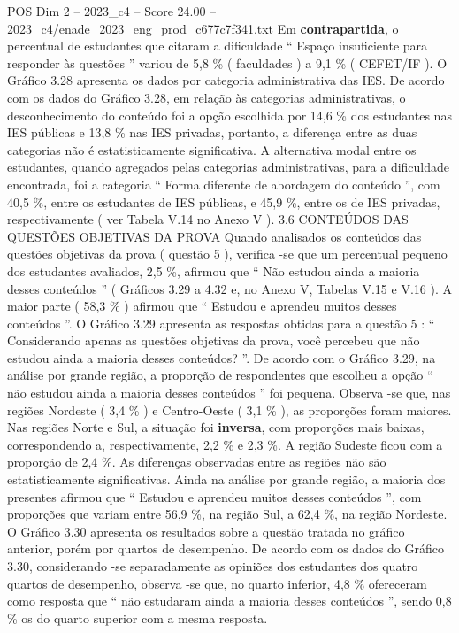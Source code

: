 \begin{textsample}{POS Dim 2 – 2023\_c4 – Score 24.00 – 2023\_c4/enade\_2023\_eng\_prod\_c677c7f341.txt}
Em \textbf{contrapartida}, o percentual de estudantes que citaram a dificuldade “ Espaço insuficiente para responder às questões ” variou de 5,8 \% ( faculdades ) a 9,1 \% ( CEFET/IF ).
O Gráfico 3.28 apresenta os dados por categoria administrativa das IES.
De acordo com os dados do Gráfico 3.28, em relação às categorias administrativas, o desconhecimento do conteúdo foi a opção escolhida por 14,6 \% dos estudantes nas IES públicas e 13,8 \% nas IES privadas, portanto, a diferença entre as duas categorias não é estatisticamente significativa.
A alternativa modal entre os estudantes, quando agregados pelas categorias administrativas, para a dificuldade encontrada, foi a categoria “ Forma diferente de abordagem do conteúdo ”, com 40,5 \%, entre os estudantes de IES públicas, e 45,9 \%, entre os de IES privadas, respectivamente ( ver Tabela V.14 no Anexo V ). 3.6 CONTEÚDOS DAS QUESTÕES OBJETIVAS DA PROVA Quando analisados os conteúdos das questões objetivas da prova ( questão 5 ), verifica -se que um percentual pequeno dos estudantes avaliados, 2,5 \%, afirmou que “ Não estudou ainda a maioria desses conteúdos ” ( Gráficos 3.29 a 4.32 e, no Anexo V, Tabelas V.15 e V.16 ).
A maior parte ( 58,3 \% ) afirmou que “ Estudou e aprendeu muitos desses conteúdos ”.
O Gráfico 3.29 apresenta as respostas obtidas para a questão 5 : “ Considerando apenas as questões objetivas da prova, você percebeu que não estudou ainda a maioria desses conteúdos? ”.
De acordo com o Gráfico 3.29, na análise por grande região, a proporção de respondentes que escolheu a opção “ não estudou ainda a maioria desses conteúdos ” foi pequena.
Observa -se que, nas regiões Nordeste ( 3,4 \% ) e Centro-Oeste ( 3,1 \% ), as proporções foram maiores.
Nas regiões Norte e Sul, a situação foi \textbf{inversa}, com proporções mais baixas, correspondendo a, respectivamente, 2,2 \% e 2,3 \%.
A região Sudeste ficou com a proporção de 2,4 \%.
As diferenças observadas entre as regiões não são estatisticamente significativas.
Ainda na análise por grande região, a maioria dos presentes afirmou que “ Estudou e aprendeu muitos desses conteúdos ”, com proporções que variam entre 56,9 \%, na região Sul, a 62,4 \%, na região Nordeste.
O Gráfico 3.30 apresenta os resultados sobre a questão tratada no gráfico anterior, porém por quartos de desempenho.
De acordo com os dados do Gráfico 3.30, considerando -se separadamente as opiniões dos estudantes dos quatro quartos de desempenho, observa -se que, no quarto inferior, 4,8 \% ofereceram como resposta que “ não estudaram ainda a maioria desses conteúdos ”, sendo 0,8 \% os do quarto superior com a mesma resposta.

\end{textsample}
